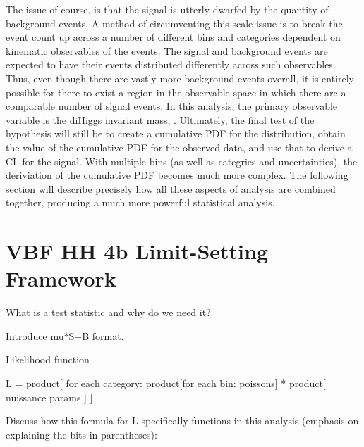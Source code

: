     The issue of course, is that the signal is utterly dwarfed by the quantity of background events.
    A method of circumventing this scale issue
        is to break the event count up across a number of different
        bins and categories dependent on kinematic observables of the events.
    The signal and background events are expected to have their events distributed differently across such observables.
    Thus, even though there are vastly more background events overall,
        it is entirely possible for there to exist a region in the observable space
        in which there are a comparable number of signal events.
    In this analysis, the primary observable variable is the diHiggs invariant mass, \mhh.
    Ultimately, the final test of the hypothesis will still be to create a cumulative PDF for the distribution,
        obtain the value of the cumulative PDF for the observed data, and use that to derive a CL for the signal.
    With multiple bins (as well as categries and uncertainties), the deriviation of the cumulative PDF becomes much more complex.
    The following section will describe precisely how all these aspects of analysis are combined together,
        producing a much more powerful statistical analysis.



\FloatBarrier
\section{VBF \to HH \to 4b Limit-Setting Framework}

    What is a test statistic and why do we need it?

    Introduce mu*S+B format.

    Likelihood function

        L = product[ for each category:
            product[for each bin: poissons]
            * product[ nuissance params ] 
        ]


    Discuss how this formula for L specifically functions in this analysis
        (emphasis on explaining the bits in parentheses):

